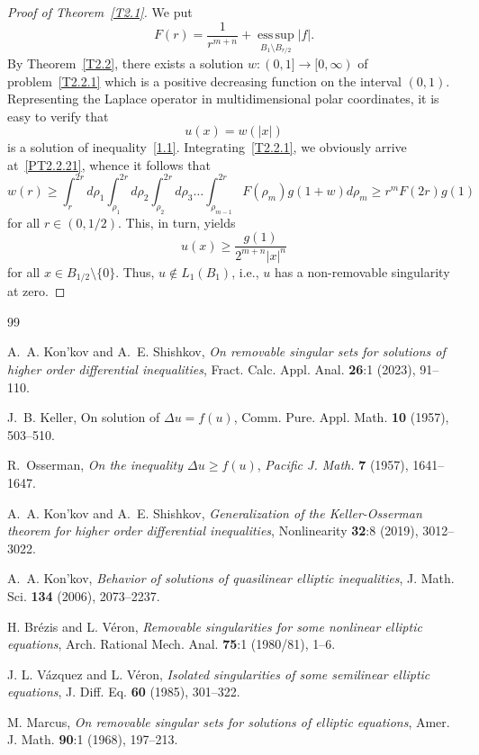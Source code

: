 \documentclass[11pt]{amsart}
\theoremstyle{definition}
\numberwithin{equation}{section}
\begin{document}
\begin{proof}[Proof of Theorem~\ref{T2.1}]
We put 
$$
	F (r)
	=
	\frac{
		1
	}{
		r^{m + n}
	}
	+
	\operatorname*{ess\,sup}_{
		B_1 \setminus B_{r / 2}
	}
	|f|.
$$
By Theorem~\ref{T2.2}, there exists a solution $w : (0, 1] \to [0, \infty)$ of problem~\eqref{T2.2.1} which is a positive decreasing function on the interval $(0, 1)$.
Representing the Laplace operator in multidimensional polar coordinates, it is easy to verify that
$$
	u (x)
	=
	w (|x|)
$$
is a solution of inequality~\eqref{1.1}.
Integrating~\eqref{T2.2.1}, we obviously arrive at~\eqref{PT2.2.21}, whence it follows that
$$
	w (r)
	\ge
	\int_r^{2 r}
	d\rho_1
	\int_{\rho_1}^{2 r}
	d\rho_2 
	\int_{\rho_2}^{2 r}
	d\rho_3
	\ldots
	\int_{\rho_{m - 1}}^{2 r}
	F (\rho_m) g (1 + w)
	d\rho_m
	\ge
	r^m
	F (2 r)
	g (1)
$$
for all $r \in (0, 1 / 2)$. This, in turn, yields
$$
	u (x)
	\ge
	\frac{
		g (1)
	}{
		2^{m + n}
		|x|^n
	}
$$
for all $x \in B_{1 / 2} \setminus \{ 0 \}$. Thus, $u \not\in L_1 (B_1)$, i.e., $u$ has a non-removable singularity at zero.
\end{proof}

\begin{thebibliography}{99}

A.~A. Kon'kov and A.~E. Shishkov,
{\it On removable singular sets for solutions of higher order differential inequalities},
Fract. Calc. Appl. Anal. {\bf 26}:1 (2023), 91--110.

J.~B. Keller,
{On solution of $\Delta u = f(u)$},
Comm. Pure. Appl. Math. {\bf 10} (1957), 503--510.

R.~Osserman,
{\it On the inequality $\Delta u \ge f(u)$},
{\it Pacific J. Math.} {\bf 7} (1957), 1641--1647.

A.~A. Kon'kov and A.~E. Shishkov,
{\it Generalization of the Keller-Osserman theorem for higher order differential inequalities},
Nonlinearity {\bf 32}:8 (2019), 3012--3022.

A.~A. Kon'kov,
{\it Behavior of solutions of quasilinear elliptic inequalities},
J. Math. Sci. {\bf 134} (2006), 2073--2237.

H. Br\'ezis and L. V\'eron, 
{\it Removable singularities for some nonlinear elliptic equations}, 
Arch. Rational Mech. Anal. {\bf 75}:1 (1980/81), 1--6.

J. L. V\'azquez and L. V\'eron,
{\it Isolated singularities of some semilinear elliptic equations},
J. Diff. Eq. {\bf 60} (1985), 301--322.

M. Marcus,
{\it On removable singular sets for solutions of elliptic equations},
Amer. J. Math. {\bf 90}:1 (1968), 197--213.

\end{thebibliography}
\end{document}
